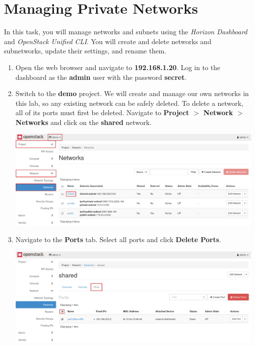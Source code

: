 \documentclass[letterpaper, 12pt]{article}
\begin{document}
\section{Managing Private Networks}
\label{sec:managing_private_networks}
In this task, you will manage networks and subnets using the \textit{Horizon Dashboard} and \textit{OpenStack Unified CLI}.
You will create and delete networks and subnetworks, update their settings, and rename them.

\begin{enumerate}
    \item Open the web browser and navigate to \textbf{192.168.1.20}.
    Log in to the dashboard as the \textbf{admin} user with the password \textbf{secret}.

    \item Switch to the \textbf{demo} project.
    We will create and manage our own networks in this lab, so any existing network can be safely deleted.
    To delete a network, all of its ports must first be deleted.
    Navigate to \textbf{Project $>$ Network $>$ Networks} and click on the \textbf{shared} network.

    \begin{center}
        \includegraphics[width=\linewidth]{images/part3/step2.png}
    \end{center}

    \item Navigate to the \textbf{Ports} tab.
    Select all ports and click \textbf{Delete Ports}.

    \begin{center}
        \includegraphics[width=\linewidth]{images/part3/step3.png}
    \end{center}


\end{enumerate}
\end{document}
